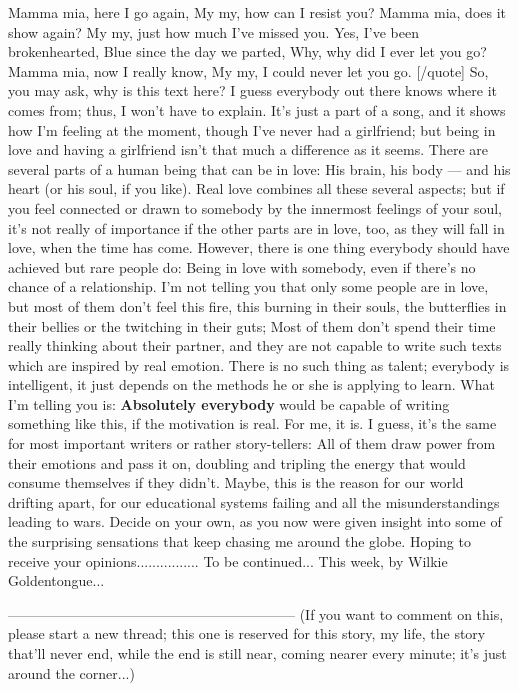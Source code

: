 Mamma mia, here I go again,
My my, how can I resist you? 
Mamma mia, does it show again?
My my, just how much I've missed you. 
Yes, I've been brokenhearted, 
Blue since the day we parted, 
Why, why did I ever let you go? 
Mamma mia, now I really know,
My my, I could never let you go. 
[/quote]
So, you may ask, why is this text here? I guess everybody out there knows where it comes from; thus, I won't have to explain. 
It's just a part of a song, and it shows how I'm feeling at the moment, though I've never had a girlfriend; but being in love and having a girlfriend isn't that much a difference as it seems. There are several parts of a human being that can be in love: His brain, his body --- and his heart (or his soul, if you like). 
Real love combines all these several aspects; but if you feel connected or drawn to somebody by the innermost feelings of your soul, it's not really of importance if the other parts are in love, too, as they will fall in love, when the time has come. 
However, there is one thing everybody should have achieved but rare people do: Being in love with somebody, even if there's no chance of a relationship. 
I'm not telling you that only some people are in love, but most of them don't feel this fire, this burning in their souls, the butterflies in their bellies or the twitching in their guts; Most of them don't spend their time really thinking about their partner, and they are not capable to write such texts which are inspired by real emotion. 
There is no such thing as talent; everybody is intelligent, it just depends on the methods he or she is applying to learn. 
What I'm telling you is: \textbf{Absolutely everybody} would be capable of writing something like this, if the motivation is real. 
For me, it is. 
I guess, it's the same for most important writers or rather story-tellers: All of them draw power from their emotions and pass it on, doubling and tripling the energy that would consume themselves if they didn't. 
Maybe, this is the reason for our world drifting apart, for our educational systems failing and all the misunderstandings leading to wars. 
Decide on your own, as you now were given insight into some of the surprising sensations that keep chasing me around the globe. 
Hoping to receive your opinions................
To be continued...
This week, by Wilkie Goldentongue...

--------------------------------------------------------------
(If you want to comment on this, please start a new thread; this one is reserved for this story, my life, the story that'll never end, while the end is still near, coming nearer every minute; it's just around the corner...)


